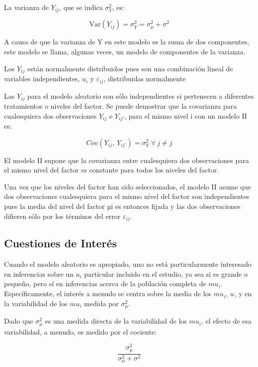 \documentclass[]{book}
\theoremstyle{definition}
\theoremstyle{definition}
\theoremstyle{definition}
\theoremstyle{remark}
\begin{document}
La varianza de \(Y_{ij}\), que se indica \(\sigma_{Y}^{2}\), es:

\[
\text{Var}\left( Y_{ij} \right) = \sigma_{Y}^{2} = \sigma_{\mu}^{2} + \sigma^{2}
\]

A causa de que la varianza de Y en este modelo es la suma de dos
componentes, este modelo se llama, algunas veces, un modelo de
componentes de la varianza.

Los \(Y_{ij}\) están normalmente distribuidos pues son una combinación
lineal de variables independientes, \(u_{i}\) y \(\varepsilon_{ij}\),
distribuidas normalmente

Las \(Y_{ij}\) para el modelo aleatorio son sólo independientes si
pertenecen a diferentes tratamientos o niveles del factor. Se puede
demostrar que la covarianza para cualesquiera dos observaciones
\(Y_{ij}\) e \(Y_{{ij}'}\), para el mismo nivel i con un modelo II es:

\[
Cov(Y_{ij},\ Y_{ij'}) = \sigma_{Y}^{2}\; \forall\ j \neq  j
\]

El modelo II supone que la covarianza entre cualesquiera dos
observaciones para el mismo nivel del factor es constante para todos los
niveles del factor.

Una vez que los niveles del factor han sido seleccionados, el modelo II
asume que dos observaciones cualesquiera para el mismo nivel del factor
son independientes pues la media del nivel del factor µi es entonces
fijada y las dos observaciones difieren sólo por los términos del error
\(\varepsilon_{ij}\).

\hypertarget{cuestiones-de-interes}{%
\subsection{Cuestiones de Interés}\label{cuestiones-de-interes}}

Cuando el modelo aleatorio es apropiado, uno no está particularmente
interesado en inferencias sobre un \(u_{i}\) particular incluido en el
estudio, ya sea si es grande o pequeño, pero sí en inferencias acerca de
la población completa de \(mu_{i}\). Específicamente, el interés a
menudo se centra sobre la media de los \(mu_{i}\), \(u_{}\), y en la
variabilidad de los \(mu_{i}\) medida por \(\sigma_{\mu}^{2}\).

Dado que \(\sigma_{\mu}^{2}\) es una medida directa de la variabilidad
de los \(mu_{i}\), el efecto de esa variabilidad, a menudo, es medido
por el cociente:

\[
\frac{\sigma_{\mu}^{2}}{\sigma_{\mu}^{2} + \sigma^{2}}
\]
\end{document}
